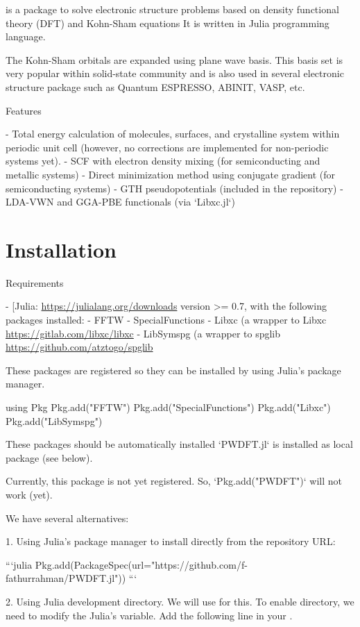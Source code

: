  is a package to solve electronic structure problems
based on density functional theory (DFT) and Kohn-Sham equations
It is written in Julia programming language.

The Kohn-Sham orbitals are expanded using plane wave basis. This basis set is
very popular within solid-state community and is also used in several electronic
structure package such as Quantum ESPRESSO, ABINIT, VASP, etc.

Features

- Total energy calculation of molecules, surfaces, and crystalline system
  within periodic unit cell (however, no corrections are 
  implemented for non-periodic systems yet).
- SCF with electron density mixing (for semiconducting and metallic systems)
- Direct minimization method using conjugate gradient (for semiconducting systems)
- GTH pseudopotentials (included in the repository)
- LDA-VWN and GGA-PBE functionals (via `Libxc.jl`)

\section{Installation}

Requirements

- [Julia: \url{https://julialang.org/downloads} version >= 0.7,
  with the following packages installed:
  - FFTW
  - SpecialFunctions
  - Libxc (a wrapper to Libxc \url{https://gitlab.com/libxc/libxc}
  - LibSymspg (a wrapper to spglib \url{https://github.com/atztogo/spglib}

These packages are registered so they can be installed by using Julia's package manager.

\begin{juliacode}
using Pkg
Pkg.add("FFTW")
Pkg.add("SpecialFunctions")
Pkg.add("Libxc")
Pkg.add("LibSymspg")
\end{juliacode}

These packages should be automatically installed `PWDFT.jl` is installed as
local package (see below).

Currently, this package is not yet registered. So, `Pkg.add("PWDFT")` will not work (yet).

We have several alternatives:

1. Using Julia's package manager to install directly from the repository URL:

```julia
Pkg.add(PackageSpec(url="https://github.com/f-fathurrahman/PWDFT.jl"))
```

2. Using Julia development directory. We will use 
   for this.
   To enable  directory, we need to modify the Julia's
   variable. Add the following line in your
  .

